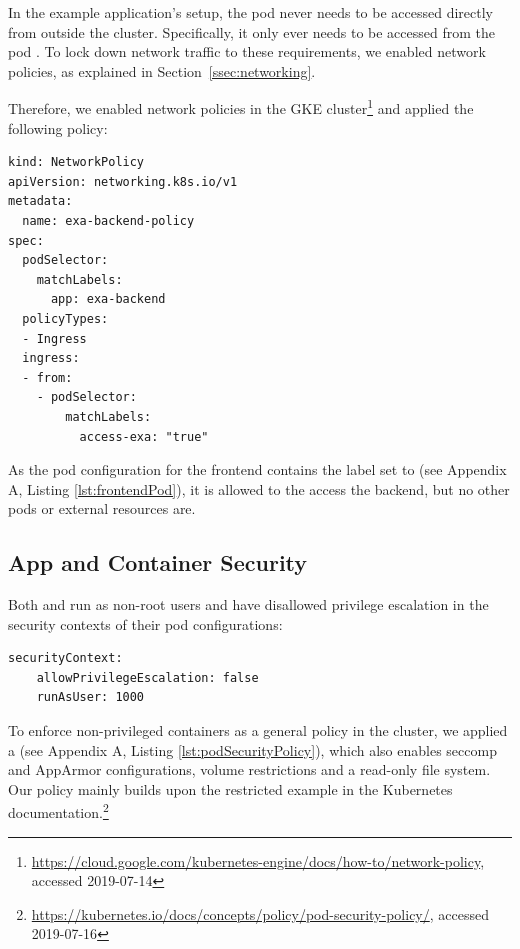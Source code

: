In the example application's setup, the pod  never needs to be accessed directly from outside the cluster. Specifically, it only ever needs to be accessed from the pod . To lock down network traffic to these requirements, we enabled network policies, as explained in Section~\ref{ssec:networking}. 

Therefore, we enabled network policies in the \ac{GKE} cluster\footnote{\url{https://cloud.google.com/kubernetes-engine/docs/how-to/network-policy}, accessed 2019-07-14} and applied the following policy:

\begin{verbatim}
kind: NetworkPolicy
apiVersion: networking.k8s.io/v1
metadata:
  name: exa-backend-policy
spec:
  podSelector:
    matchLabels:
      app: exa-backend
  policyTypes:
  - Ingress
  ingress:
  - from:
    - podSelector:
        matchLabels:
          access-exa: "true"
\end{verbatim}

As the pod configuration for the frontend contains the label  set to  (see Appendix A, Listing \ref{lst:frontendPod}), it is allowed to the access the backend, but no other pods or external resources are.

\subsection{App and Container Security} \label{ssec:exaLayer4}

Both  and  run as non-root users and have disallowed privilege escalation in the security contexts of their pod configurations:

\begin{verbatim}
securityContext:
    allowPrivilegeEscalation: false
    runAsUser: 1000
\end{verbatim}

To enforce non-privileged containers as a general policy in the cluster, we applied a  (see Appendix A, Listing \ref{lst:podSecurityPolicy}), which also enables seccomp and AppArmor configurations, volume restrictions and a read-only file system. Our policy mainly builds upon the restricted example in the Kubernetes documentation.\footnote{\url{https://kubernetes.io/docs/concepts/policy/pod-security-policy/}, accessed 2019-07-16} 

